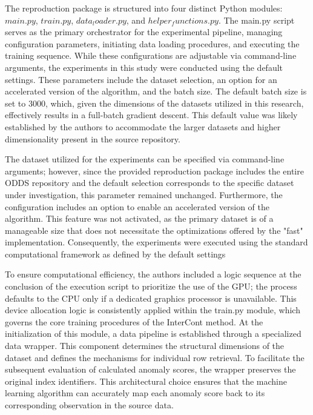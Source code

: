 The reproduction package is structured into four distinct Python modules: $main.py$, $train.py$, $data_loader.py$, and $helper_functions.py$. 
The main.py script serves as the primary orchestrator for the experimental pipeline, managing configuration parameters, initiating data loading procedures, and executing the training sequence. 
While these configurations are adjustable via command-line arguments, the experiments in this study were conducted using the default settings. 
These parameters include the dataset selection, an option for an accelerated version of the algorithm, and the batch size. 
The default batch size is set to 3000, which, given the dimensions of the datasets utilized in this research, effectively results in a full-batch gradient descent. 
This default value was likely established by the authors to accommodate the larger datasets and higher dimensionality present in the source repository.


The dataset utilized for the experiments can be specified via command-line arguments; however, since the provided reproduction package includes the entire ODDS repository and the default selection corresponds to the specific dataset under investigation, this parameter remained unchanged. 
Furthermore, the configuration includes an option to enable an accelerated version of the algorithm. 
This feature was not activated, as the primary dataset is of a manageable size that does not necessitate the optimizations offered by the "fast" implementation. 
Consequently, the experiments were executed using the standard computational framework as defined by the default settings


To ensure computational efficiency, the authors included a logic sequence at the conclusion of the execution script to prioritize the use of the GPU; the process defaults to the CPU only if a dedicated graphics processor is unavailable. 
This device allocation logic is consistently applied within the train.py module, which governs the core training procedures of the InterCont method. 
At the initialization of this module, a data pipeline is established through a specialized data wrapper. 
This component determines the structural dimensions of the dataset and defines the mechanisms for individual row retrieval. 
To facilitate the subsequent evaluation of calculated anomaly scores, the wrapper preserves the original index identifiers. 
This architectural choice ensures that the machine learning algorithm can accurately map each anomaly score back to its corresponding observation in the source data.



